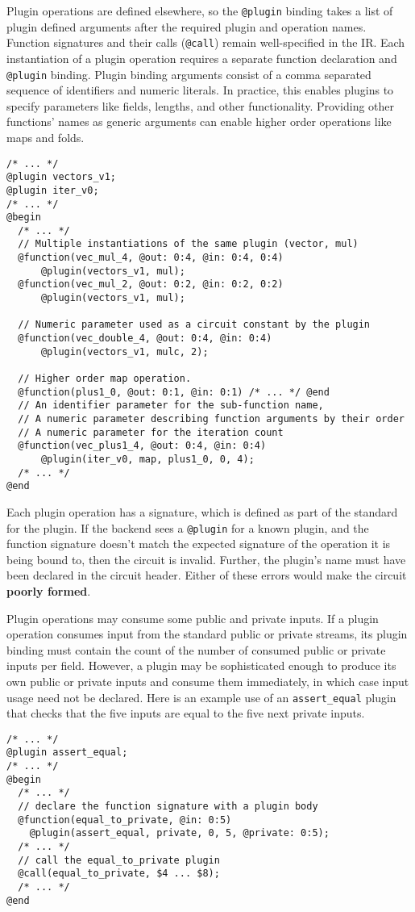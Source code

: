 Plugin operations are defined elsewhere, so the \texttt{@plugin} binding takes a list of plugin defined arguments after the required plugin and operation names.
Function signatures and their calls (\texttt{@call}) remain well-specified in the IR.
Each instantiation of a plugin operation %
requires a separate function declaration and \texttt{@plugin} binding.
Plugin binding arguments consist of a comma separated sequence
of identifiers and numeric literals.
In practice, this enables plugins to specify parameters like fields, lengths, and other functionality.
Providing other functions' names as generic arguments can enable higher order operations like maps and folds. 
%
\begin{lstlisting}[language=ir]
/* ... */
@plugin vectors_v1;
@plugin iter_v0;
/* ... */
@begin
  /* ... */
  // Multiple instantiations of the same plugin (vector, mul)
  @function(vec_mul_4, @out: 0:4, @in: 0:4, 0:4)
      @plugin(vectors_v1, mul);
  @function(vec_mul_2, @out: 0:2, @in: 0:2, 0:2)
      @plugin(vectors_v1, mul);

  // Numeric parameter used as a circuit constant by the plugin
  @function(vec_double_4, @out: 0:4, @in: 0:4)
      @plugin(vectors_v1, mulc, 2);

  // Higher order map operation.
  @function(plus1_0, @out: 0:1, @in: 0:1) /* ... */ @end
  // An identifier parameter for the sub-function name,
  // A numeric parameter describing function arguments by their order
  // A numeric parameter for the iteration count
  @function(vec_plus1_4, @out: 0:4, @in: 0:4)
      @plugin(iter_v0, map, plus1_0, 0, 4);
  /* ... */
@end
\end{lstlisting}

Each plugin operation has a signature, which is defined as part of the standard for the plugin.
If the backend sees a \texttt{@plugin} for a known plugin, and the function signature doesn't match the expected signature of the operation it is being bound to, then the circuit is invalid. %
Further, the plugin's name must have been declared in the circuit header.
Either of these errors would make the circuit \textbf{poorly formed}.

Plugin operations may consume some public and private inputs. %
If a plugin operation consumes input from the standard public or private streams, its plugin binding
must contain the count of the number of consumed public or private inputs %
per field.
However, a plugin may be sophisticated enough to produce its own public or private inputs and consume them immediately, in which case input usage need not be declared.
%
Here is an example use of an \texttt{assert\_equal} plugin that checks that the five inputs are equal to the five next private inputs.
\begin{lstlisting}[language=ir]
/* ... */
@plugin assert_equal;
/* ... */
@begin
  /* ... */
  // declare the function signature with a plugin body
  @function(equal_to_private, @in: 0:5)
    @plugin(assert_equal, private, 0, 5, @private: 0:5);
  /* ... */
  // call the equal_to_private plugin
  @call(equal_to_private, $4 ... $8);
  /* ... */
@end
\end{lstlisting}

